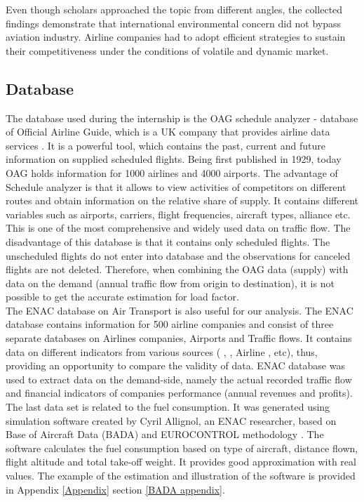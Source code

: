 \documentclass[titlepage, 11pt]{article}
\begin{document}
\tab Even though scholars approached the topic from different angles, the collected findings demonstrate that international environmental concern did not bypass aviation industry. Airline companies had to adopt efficient strategies to sustain their competitiveness under the conditions of volatile and dynamic market.  

\subsection{Database} \label{Database}
\tab The database used during the internship is the OAG schedule analyzer - database of Official Airline Guide, which is a UK company that provides airline data services \cite{OAG}. It is a powerful tool, which contains the past, current and future information on supplied scheduled flights. Being first published in 1929, today OAG holds information for 1000 airlines and 4000 airports. The advantage of Schedule analyzer is that it allows to view  activities of competitors on different routes and obtain information on the relative share of supply. It contains different variables such as airports, carriers, flight frequencies, aircraft types, alliance etc. This is one of the most comprehensive and widely used data on traffic flow. The disadvantage of this database is that it contains only scheduled flights. The unscheduled flights do not enter into database and the observations for canceled flights are not deleted. Therefore, when combining the OAG data (supply) with data on the demand (annual traffic flow from origin to destination), it is not possible to get the accurate estimation for load factor.\\ 
\tab The ENAC database on Air Transport is also useful for our analysis. The ENAC database contains information for 500 airline companies and consist of three separate databases on Airlines companies, Airports and Traffic flows. It contains data on different indicators from various sources (\citeauthor{IATA} \cite{IATA}, \citeauthor{ICAO} \cite{ICAO}, Airline \citeauthor{AirlineMonitor} \cite{AirlineMonitor}, etc), thus, providing an opportunity to compare the validity of data. ENAC database was used to extract data on the demand-side, namely the actual recorded traffic flow and financial indicators of companies performance (annual revenues and profits).  \\ 
\tab The last data set is related to the fuel consumption. It was generated using simulation software created by Cyril Allignol, an ENAC researcher, based on Base of Aircraft Data (BADA) and EUROCONTROL methodology \cite{BADA}. The software calculates the fuel consumption based on type of aircraft, distance flown, flight altitude and total take-off weight. It provides good approximation with real values. The example of the estimation and illustration of the software is provided in Appendix \ref{Appendix} section \ref{BADA appendix}.  
\end{document}
